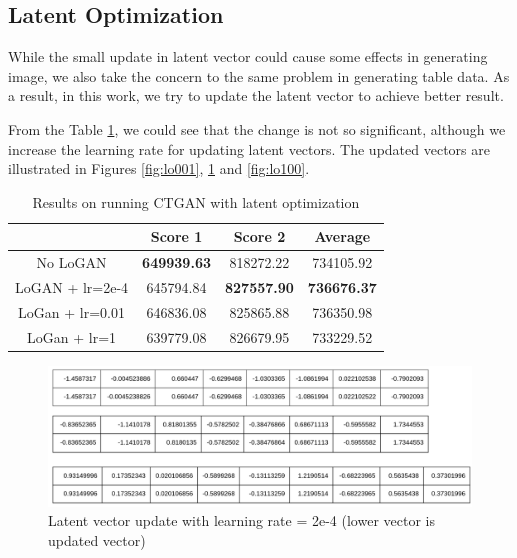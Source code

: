 \documentclass{article}
\begin{document}
\subsection{Latent Optimization}

While the small update in latent vector could cause some effects in generating image, we also take the concern to the same problem in generating table data. As a result, in this work, we try to update the latent vector to achieve better result.

From the Table \ref{fig:lo}, we could see that the change is not so significant, although we increase the learning rate for updating latent vectors. The updated vectors are illustrated in Figures \ref{fig:lo001}, \ref{fig:lo2e4} and \ref{fig:lo100}.


\begin{table}[htpb] \centering
	\begin{tabular}{cccc}
		\hline
		\multicolumn{1}{l}{} & \textbf{Score 1}   & \textbf{Score 2}   & \textbf{Average}   \\ \hline
		No LoGAN             & \textbf{649939.63} & 818272.22          & 734105.92          \\ \hline
		LoGAN + lr=2e-4      & 645794.84          & \textbf{827557.90} & \textbf{736676.37} \\ \hline
		LoGan + lr=0.01      & 646836.08          & 825865.88          & 736350.98          \\ \hline
		LoGan + lr=1         & 639779.08          & 826679.95          & 733229.52          \\ \hline
	\end{tabular}
\caption{Results on running CTGAN with latent optimization}
\label{fig:lo}
\end{table}


\begin{figure}[h]
	\centering
	\includegraphics[scale=0.3]{figures/lo2e4.png}
	\caption{Latent vector update with learning rate = 2e-4 (lower vector is updated vector)}
	\label{fig:lo2e4}
\end{figure}
\end{document}
